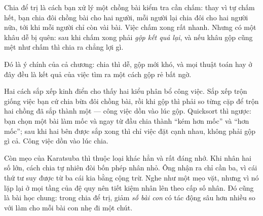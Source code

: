 \documentclass[../../algorithm.tex]{subfiles}
\begin{document}
\begin{dongian}
Chia để trị là cách bạn xử lý một chồng bài kiểm tra cần chấm: thay vì tự chấm hết, bạn chia đôi chồng bài cho hai người, mỗi người lại chia đôi cho hai người nữa, tới khi mỗi người chỉ còn vài bài. Việc chấm xong rất nhanh. Nhưng có một khâu dễ bị quên: sau khi chấm xong phải \emph{gộp kết quả lại}, và nếu khâu gộp cũng mệt như chấm thì chia ra chẳng lợi gì.

Đó là ý chính của cả chương: chia thì dễ, gộp mới khó, và mọi thuật toán hay ở đây đều là kết quả của việc tìm ra một cách gộp rẻ bất ngờ.

Hai cách sắp xếp kinh điển cho thấy hai kiểu phân bổ công việc. Sắp xếp trộn giống việc bạn cứ chia bừa đôi chồng bài, rồi khi gộp thì phải so từng cặp để trộn hai chồng đã sắp thành một --- công việc dồn vào lúc gộp. Quicksort thì ngược: bạn chọn một bài làm mốc và ngay từ đầu chia thành ``kém hơn mốc'' và ``hơn mốc''; sau khi hai bên được sắp xong thì chỉ việc đặt cạnh nhau, không phải gộp gì cả. Công việc dồn vào lúc chia.

Còn mẹo của Karatsuba thì thuộc loại khác hẳn và rất đáng nhớ. Khi nhân hai số lớn, cách chia tự nhiên đòi bốn phép nhân nhỏ. Ông nhận ra chỉ cần ba, vì cái thứ tư suy được từ ba cái kia bằng cộng trừ. Nghe như một mẹo vặt, nhưng vì nó lặp lại ở mọi tầng của đệ quy nên tiết kiệm nhân lên theo cấp số nhân. Đó cũng là bài học chung: trong chia để trị, giảm \emph{số bài con} có tác động sâu hơn nhiều so với làm cho mỗi bài con nhẹ đi một chút.
\end{dongian}
\end{document}

